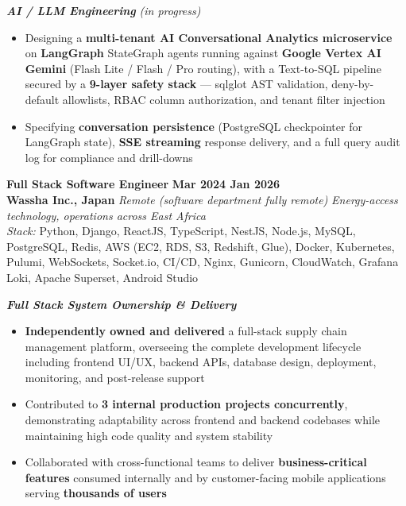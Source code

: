 \documentclass[a4paper,11.5pt]{article}
\newcommand{\h}[1]{\textbf{\textcolor{hgray}{#1}}}
\begin{document}
\vspace{0.25em}
\textit{\textbf{\textcolor{titlenavy}{\small AI / LLM Engineering}}} \textit{\small (in progress)}
\begin{itemize}
  \item Designing a \h{multi-tenant AI Conversational Analytics microservice} on \h{LangGraph} StateGraph agents running against \h{Google Vertex AI Gemini} (Flash Lite / Flash / Pro routing), with a Text-to-SQL pipeline secured by a \h{9-layer safety stack} — sqlglot AST validation, deny-by-default allowlists, RBAC column authorization, and tenant filter injection
  \item Specifying \h{conversation persistence} (PostgreSQL checkpointer for LangGraph state), \h{SSE streaming} response delivery, and a full query audit log for compliance and drill-downs
\end{itemize}

\vspace{0.4em}

{\large\bfseries\textcolor{titlenavy}{Full Stack Software Engineer}} \hfill \textbf{Mar 2024 \textendash{} Jan 2026}\\
\textbf{Wassha Inc., Japan} \textbar{} \textit{Remote (software department fully remote)}
\hfill \textit{Energy-access technology, operations across East Africa}\\[0.2em]
\textit{Stack:} Python, Django, ReactJS, TypeScript, NestJS, Node.js, MySQL, PostgreSQL, Redis, AWS (EC2, RDS, S3, Redshift, Glue), Docker, Kubernetes, Pulumi, WebSockets, Socket.io, CI/CD, Nginx, Gunicorn, CloudWatch, Grafana Loki, Apache Superset, Android Studio

\vspace{0.3em}
\textit{\textbf{\textcolor{titlenavy}{\small Full Stack System Ownership \& Delivery}}}
\begin{itemize}
  \item \h{Independently owned and delivered} a full-stack supply chain management platform, overseeing the complete development lifecycle including frontend UI/UX, backend APIs, database design, deployment, monitoring, and post-release support
  \item Contributed to \h{3 internal production projects concurrently}, demonstrating adaptability across frontend and backend codebases while maintaining high code quality and system stability
  \item Collaborated with cross-functional teams to deliver \h{business-critical features} consumed internally and by customer-facing mobile applications serving \h{thousands of users}
\end{itemize}
\end{document}
